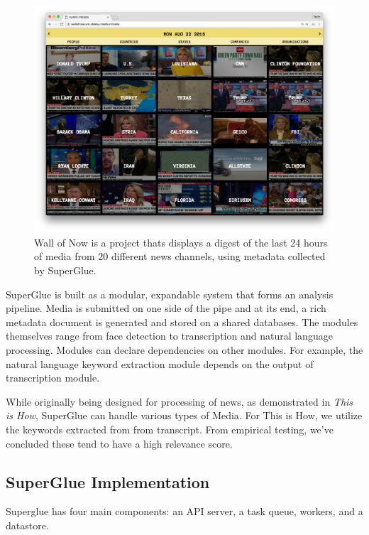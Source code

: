    \begin{figure}[thpb]
      \centering
      \includegraphics[width=\textwidth]{figures/wallofnow.png}
      \caption{Wall of Now\cite{wallofnow2016} is a project thats displays a digest of the last 24 hours of media from 20 different news channels, using metadata collected by SuperGlue.}
      \label{fig_wallofnow}
   \end{figure}


SuperGlue is built as a modular, expandable system that forms an analysis pipeline. Media is submitted on one side of the pipe and at its end, a rich metadata document is generated and stored on a shared databases. The modules themselves range from face detection to transcription and natural language processing. Modules can declare dependencies on other modules. For example, the natural language keyword extraction module depends on the output of transcription module.

While originally being designed for processing of news, as demonstrated in \textit{This is How}, SuperGlue can handle various types of Media. For This is How, we utilize the keywords extracted from from transcript. From empirical testing, we've concluded these tend to have a high relevance score.    

\subsection{SuperGlue Implementation}

Superglue has four main components: an API server, a task queue, workers, and a datastore. 

